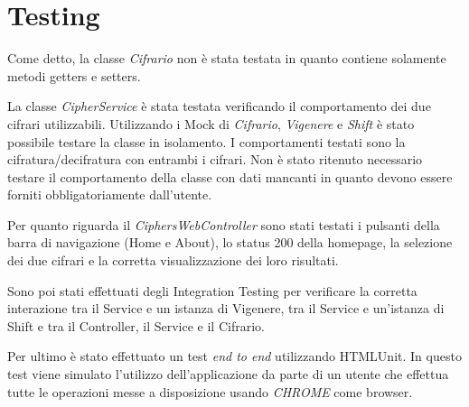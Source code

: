 \documentclass[12pt]{article}
\begin{document}
\section{Testing}
	Come detto, la classe \emph{Cifrario} non è stata testata in quanto contiene solamente metodi getters e setters.
	
	La classe \emph{CipherService} è stata testata verificando il comportamento dei due cifrari utilizzabili. Utilizzando i Mock di \emph{Cifrario}, \emph{Vigenere} e \emph{Shift} è stato possibile testare la classe in isolamento. I comportamenti testati sono la cifratura/decifratura con entrambi i cifrari. Non è stato ritenuto necessario testare il comportamento della classe con dati mancanti in quanto devono essere forniti obbligatoriamente dall'utente.
	
	Per quanto riguarda il \emph{CiphersWebController} sono stati testati i pulsanti della barra di navigazione (Home e About), lo status 200 della homepage, la selezione dei due cifrari e la corretta visualizzazione dei loro risultati.
	
	Sono poi stati effettuati degli Integration Testing per verificare la corretta interazione tra il Service e un istanza di Vigenere, tra il Service e un'istanza di Shift e tra il Controller, il Service e il Cifrario.
	
	Per ultimo è stato effettuato un test \emph{end to end} utilizzando HTMLUnit. In questo test viene simulato l'utilizzo dell'applicazione da parte di un utente che effettua tutte le operazioni messe a disposizione usando \emph{CHROME} come browser.
\end{document}

